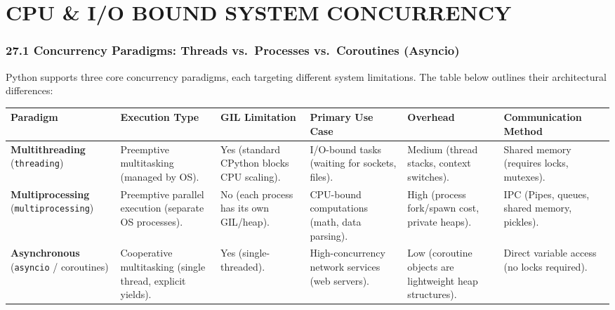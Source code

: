 \hypertarget{cpu-io-bound-system-concurrency}{%
\chapter{CPU \& I/O BOUND SYSTEM
CONCURRENCY}\label{cpu-io-bound-system-concurrency}}

\hypertarget{concurrency-paradigms-threads-vs.-processes-vs.-coroutines-asyncio}{%
\subsection{27.1 Concurrency Paradigms: Threads vs.~Processes
vs.~Coroutines
(Asyncio)}\label{concurrency-paradigms-threads-vs.-processes-vs.-coroutines-asyncio}}

Python supports three core concurrency paradigms, each targeting
different system limitations. The table below outlines their
architectural differences:

\begin{longtable}[]{@{}
  >{\raggedright\arraybackslash}p{}
  >{\raggedright\arraybackslash}p{}
  >{\raggedright\arraybackslash}p{}
  >{\raggedright\arraybackslash}p{}
  >{\raggedright\arraybackslash}p{}
  >{\raggedright\arraybackslash}p{}@{}}
\toprule
Paradigm & Execution Type & GIL Limitation & Primary Use Case & Overhead
& Communication Method \\
\midrule
\endhead
\textbf{Multithreading} (\passthrough{\lstinline!threading!}) &
Preemptive multitasking (managed by OS). & Yes (standard CPython blocks
CPU scaling). & I/O-bound tasks (waiting for sockets, files). & Medium
(thread stacks, context switches). & Shared memory (requires locks,
mutexes). \\
\textbf{Multiprocessing} (\passthrough{\lstinline!multiprocessing!}) &
Preemptive parallel execution (separate OS processes). & No (each
process has its own GIL/heap). & CPU-bound computations (math, data
parsing). & High (process fork/spawn cost, private heaps). & IPC (Pipes,
queues, shared memory, pickles). \\
\textbf{Asynchronous} (\passthrough{\lstinline!asyncio!} / coroutines) &
Cooperative multitasking (single thread, explicit yields). & Yes
(single-threaded). & High-concurrency network services (web servers). &
Low (coroutine objects are lightweight heap structures). & Direct
variable access (no locks required). \\
\bottomrule
\end{longtable}

